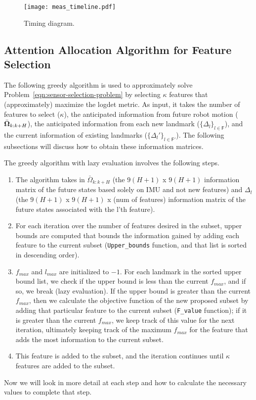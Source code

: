 \begin{figure}
\centering
\texttt{[image: meas\_timeline.pdf]} 
\caption{Timing diagram.}
\label{fig:meas_timeline} 
\end{figure}


\subsection{Attention Allocation Algorithm for Feature Selection}\label{sub:attn_algo}

The following greedy algorithm is used to approximately solve Problem~\eqref{eqn:sensor-selection-problem} by selecting $\kappa$ features that (approximately) maximize the logdet metric.
As input, it takes the number of features to select ($\kappa$), the anticipated information from future robot motion ($\bar{\boldsymbol \Omega}_{k:k+H}$), the anticipated information from each new landmark ($\{\Delta_l\}_{l\in\mathsf{F}}$), and the current information of existing landmarks ($\{\Delta_l'\}_{l\in\mathsf{F}'}$).
The following subsections will discuss how to obtain these information matrices.

The greedy algorithm with lazy evaluation involves the following steps. 
\begin{enumerate}
    \item The algorithm takes in $\bar{\Omega}_{k:k+H}$ (the $9(H+1)$ x $9(H+1)$ information matrix of the future states based solely on IMU and not new features) and $\Delta_l$ (the $9(H+1)$ x $9(H+1)$ x (num of features) information matrix of the future states associated with the l'th feature).
    \item For each iteration over the number of features desired in the subset, upper bounds are computed that bounds the information gained by adding each feature to the current subset (\texttt{Upper\_bounds} function, and that list is sorted in descending order).
    \item $f_{max}$ and $l_{max}$ are initialized to $-1$. For each landmark in the sorted upper bound list, we check if the upper bound is less than the current $f_{max}$, and if so, we break (lazy evaluation). If the upper bound is greater than the current $f_{max}$, then we calculate the objective function of the new proposed subset by adding that particular feature to the current subset (\texttt{F\_value} function); if it is greater than the current $f_{max}$, we keep track of this value for the next iteration, ultimately keeping track of the maximum $f_{max}$ for the feature that adds the most information to the current subset.
    \item This feature is added to the subset, and the iteration continues until $\kappa$ features are added to the subset.
\end{enumerate}
Now we will look in more detail at each step and how to calculate the necessary values to complete that step.


